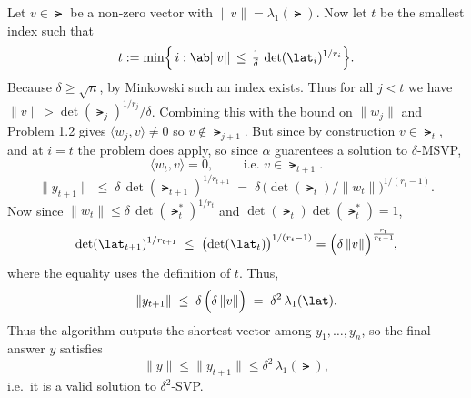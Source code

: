 \documentclass[12pt]{amsart}
\begin{document}
\begin{problem}
\begin{subproblem}
      Let \(v\in\lat\) be a non‑zero vector with \(\lVert v\rVert=\lambda_1(\lat)\).
      Now let $t$ be the smallest index such that
      \[t := \min\Bigl\{\,i:\ab||v||\,\le\, \tfrac{1}{\delta}\,\det(\lat_i)^{1/r_i} \Bigr\}.\] 
      Because \(\delta\ge\sqrt{n}\), by Minkowski such an index exists.
      Thus for all \(j<t\) we have
      \(\lVert v\rVert > \det(\lat_j)^{1/r_j}/\delta\).
      Combining this with the bound on \(\lVert w_j\rVert\) and
      Problem 1.2 gives
      \(\langle w_j , v\rangle \neq 0\) so \(v\notin\lat_{j+1}\).
      But since by construction \(v\in\lat_t\), and at \(i=t\) the problem does apply, so since $\alpha$ guarentees a solution to $\delta$-MSVP,
      \[ \langle w_t , v\rangle = 0, \qquad\text{ i.e.\ } v\in\lat_{t+1}. \]
      \[ \lVert y_{t+1}\rVert \;\le\; \delta\,\det(\lat_{t+1})^{1/r_{t+1}} \;=\;  \delta\,\bigl(\det(\lat_t)/\lVert w_t\rVert\bigr)^{1/(r_t-1)} . \]
      Now since \(\lVert w_t\rVert\le\delta\,\det(\lat_t^{*})^{1/r_t}\)
      and \(\det(\lat_t)\det(\lat_t^{*})=1\),
      \[ \det(\lat_{t+1})^{1/r_{t+1}} \;\le\; \bigl(\det(\lat_t)\bigr)^{1/(r_t-1)} =\Bigl(\delta\,\lVert v\rVert\Bigr)^{\frac{r_t}{r_t-1}}\!, \]
      where the equality uses the definition of \(t\).
      Thus,
      \[ \lVert y_{t+1}\rVert \;\le\; \delta\,\Bigl(\delta\,\lVert v\rVert\Bigr) \;=\; \delta^{2}\,\lambda_1(\lat). \]
      Thus the algorithm outputs the shortest vector among
      \(y_1,\dots,y_n\),
      so the final answer \(y\) satisfies
      \[ \lVert y\rVert\le\lVert y_{t+1}\rVert\le\delta^{2}\,\lambda_1(\lat), \]
      i.e.\ it is a valid solution to \(\delta^{2}\)-SVP.
    \end{subproblem}
  \end{problem}
\end{document}
